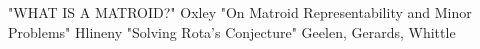 
\begin{thebibliography}{10}

"WHAT IS A MATROID?" Oxley
"On Matroid Representability and Minor Problems" Hlineny
"Solving Rota’s Conjecture" Geelen, Gerards, Whittle

\end{thebibliography}
